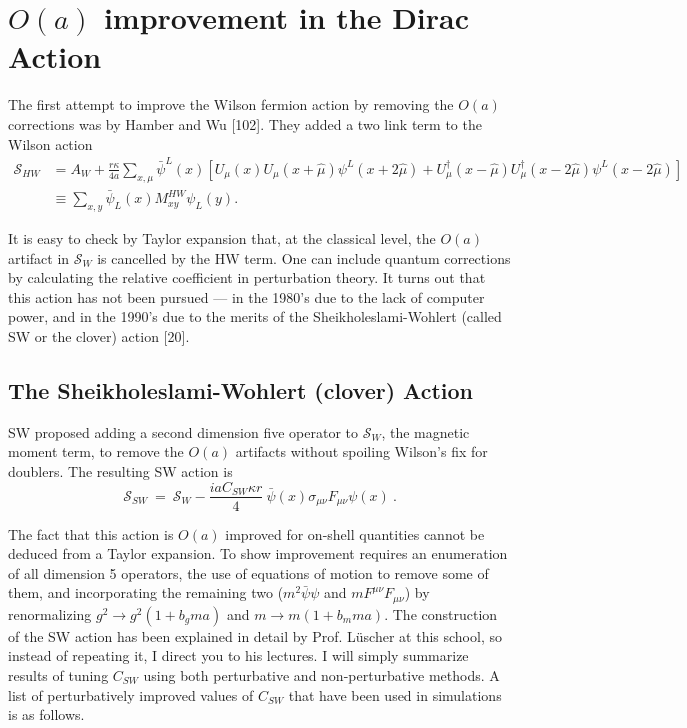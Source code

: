 \chapter{$O(a)$ improvement in the Dirac Action}

The first attempt to improve the Wilson fermion action by removing the
$O(a)$ corrections was by Hamber and Wu [102].  They added a two link
term to the Wilson action
\begin{align}
\mathcal{S}_{HW}
&= A_W + \frac{r\kappa}{4a} \sum_{x,\mu} \bar{\psi}^L(x)
   \left[ U_\mu (x) U_\mu (x+\hat{\mu}) \psi^L (x+2\hat{\mu})
   + U_\mu^\dagger (x-\hat{\mu}) U_\mu^\dagger (x-2\hat{\mu}) \psi^L (x-2\hat{\mu}) \right] \nonumber\\
&\equiv \sum_{x,y} \bar{\psi}_L (x) M_{xy}^{HW} \psi_L (y) .
\label{eq:HWaction}
\end{align}

It is easy to check by Taylor expansion that, at the classical level,
the $O(a)$ artifact in $\mathcal{S}_W$ is cancelled by the HW term.  One can
include quantum corrections by calculating the relative coefficient in
perturbation theory.  It turns out that this action has not been
pursued --- in the 1980's due to the lack of computer power, and in the
1990's due to the merits of the Sheikholeslami-Wohlert (called SW or
the clover) action [20].

\section{The Sheikholeslami-Wohlert (clover) Action}

SW proposed adding a second dimension five operator to $\mathcal{S}_W$, the
magnetic moment term, to remove the $O(a)$ artifacts without
spoiling Wilson's fix for doublers.  The resulting SW action is
\begin{equation}
\mathcal{S}_{SW} \ = \ \mathcal{S}_W -
   \frac{i a C_{SW} \kappa r}{4}\ \bar{\psi}(x) \sigma_{\mu\nu} F_{\mu\nu} \psi(x) \ .
\label{eq:SWact}
\end{equation}

The fact that this action is $O(a)$ improved for on-shell quantities
cannot be deduced from a Taylor expansion.  To show improvement
requires an enumeration of all dimension 5 operators, the use of
equations of motion to remove some of them, and incorporating the
remaining two ($m^2 \bar{\psi}\psi$ and $m F^{\mu\nu} F_{\mu\nu}$)
by renormalizing $g^2 \to g^2 (1+b_g ma)$ and $m \to m (1+b_m ma)$.  The
construction of the SW action has been explained in detail by Prof.
L\"uscher at this school, so instead of repeating it, I direct you to
his lectures.  I will simply summarize results of tuning $C_{SW}$ using
both perturbative and non-perturbative methods.  A list of
perturbatively improved values of $C_{SW}$ that have been used in
simulations is as follows.


